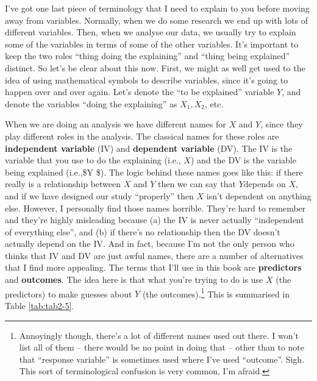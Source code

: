 \documentclass[
]{book}
\begin{document}
I've got one last piece of terminology that I need to explain to you before moving away from variables. Normally, when we do some research we end up with lots of different variables. Then, when we analyse our data, we usually try to explain some of the variables in terms of some of the other variables. It's important to keep the two roles ``thing doing the explaining'' and ``thing being explained'' distinct. So let's be clear about this now. First, we might as well get used to the idea of using mathematical symbols to describe variables, since it's going to happen over and over again. Let's denote the ``to be explained'' variable \(Y\), and denote the variables ``doing the explaining'' as \(X_1 , X_2\), etc.

When we are doing an analysis we have different names for \(X\) and \(Y\), since they play different roles in the analysis. The classical names for these roles are \textbf{independent variable} (IV) and \textbf{dependent variable} (DV). The IV is the variable that you use to do the explaining (i.e., \(X\)) and the DV is the variable being explained (i.e.,\$Y \$). The logic behind these names goes like this: if there really is a relationship between \(X\) and \(Y\) then we can say that \(Y\)depends on \(X\), and if we have designed our study ``properly'' then \(X\) isn't dependent on anything else. However, I personally find those names horrible. They're hard to remember and they're highly misleading because (a) the IV is never actually ``independent of everything else'', and (b) if there's no relationship then the DV doesn't actually depend on the IV. And in fact, because I'm not the only person who thinks that IV and DV are just awful names, there are a number of alternatives that I find more appealing. The terms that I'll use in this book are \textbf{predictors} and \textbf{outcomes}. The idea here is that what you're trying to do is use \(X\) (the predictors) to make guesses about \(Y\) (the outcomes).\footnote{Annoyingly though, there's a lot of different names used out there. I won't list all of them -- there would be no point in doing that -- other than to note that ``response variable'' is sometimes used where I've used ``outcome''. Sigh. This sort of terminological confusion is very common, I'm afraid.} This is summarised in Table \ref{tab:tab2-5}.

 
  \providecommand{\huxb}[2]{\arrayrulecolor[RGB]{#1}\global\arrayrulewidth=#2pt}
  \providecommand{\huxvb}[2]{\color[RGB]{#1}\vrule width #2pt}
  \providecommand{\huxtpad}[1]{\rule{0pt}{#1}}
  \providecommand{\huxbpad}[1]{\rule[-#1]{0pt}{#1}}
\end{document}
